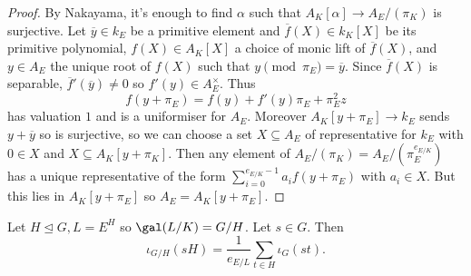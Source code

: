\documentclass[a4paper]{article}
\begin{document}
\begin{proof}
  By Nakayama, it's enough to find \(\alpha\) such that \(A_K[\alpha] \to A_E/(\pi_K)\) is surjective. Let \(\overline y \in k_E\) be a primitive element and \(\overline f(X) \in k_K[X]\) be its primitive polynomial, \(f(X) \in A_K[X]\) a choice of monic lift of \(\overline f(X)\), and \(y \in A_E\) the unique root of \(f(X)\) such that \(y \pmod{\pi_E} = \overline y\). Since \(\overline f(X)\) is separable, \(\overline f'(\overline y) \neq 0\) so \(f'(y) \in A_E^\times\). Thus
  \[
    f(y + \pi_E) = f(y) + f'(y) \pi_E + \pi_E^2 z
  \]
  has valuation \(1\) and is a uniformiser for \(A_E\). Moreover \(A_K[y + \pi_E] \to k_E\) sends \(y + \overline y\) so is surjective, so we can choose a set \(X \subseteq A_E\) of representative for \(k_E\) with \(0 \in X\) and \(X \subseteq A_K[y + \pi_K]\). Then any element of \(A_E/(\pi_K) = A_E/(\pi_E^{e_{E/K}})\) has a unique representative of the form \(\sum_{i = 0}^{e_{E/K} - 1} a_i f(y + \pi_E)\) with \(a_i \in X\). But this lies in \(A_K[y + \pi_E]\) so \(A_E = A_K[y + \pi_E]\).
\end{proof}

\begin{lemma}
  Let \(H \trianglelefteq G, L = E^H\) so \(\gal(L/K) = G/H\). Let \(s \in G\). Then
  \[
    \iota_{G/H}(sH) = \frac{1}{e_{E/L}} \sum_{t \in H} \iota_G(st).
  \]
\end{lemma}
\end{document}
